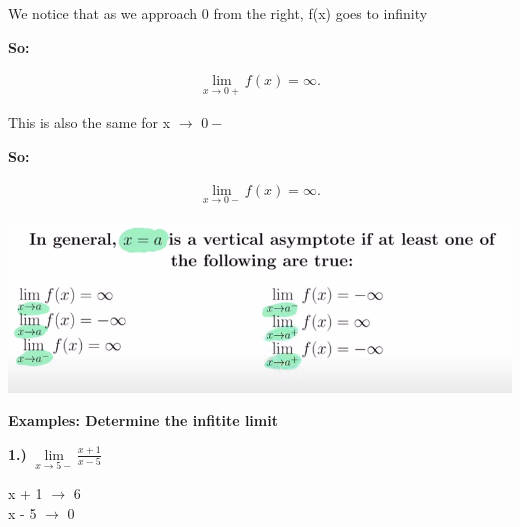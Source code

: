 \documentclass{report}
\begin{document}
    \bigbreak \noindent 
    We notice that as we approach 0 from the right, f(x) goes to infinity

    \bigbreak \noindent 
    \textbf{So:}
    
    \begin{large}
        \begin{align*}
            \lim\limits_{x \to 0+}{f(x) = \infty}
        .\end{align*}
    \end{large}
    
    \bigbreak \noindent 
    This is also the same for x $\rightarrow$ $0-$
    
    \bigbreak \noindent 
    \textbf{So:}

    \begin{large}
        \begin{align*}
            \lim\limits_{x \to 0-}{f \left(x\right) = \infty}
        .\end{align*}
    \end{large}

    \bigbreak \noindent 

    \begin{center}
        \includegraphics[scale=0.5]{../images/ass.png}
    \end{center}

    \bigbreak \noindent \bigbreak \noindent 
    \begin{large}
       \textbf{Examples: Determine the infitite limit} 
    \end{large}

    \bigbreak \noindent 
    \begin{large}
       \textbf{1.)} $\lim\limits_{x \to 5-}{ \frac{x+1}{x-5}}$ 
    \end{large}
    
    \bigbreak \noindent \bigbreak \noindent 
    \begin{center}
        \begin{large}
            x + 1 $\longrightarrow$ 6 \\
            x - 5 $\longrightarrow$ 0 
        \end{large}
    \end{center}
\end{document}
